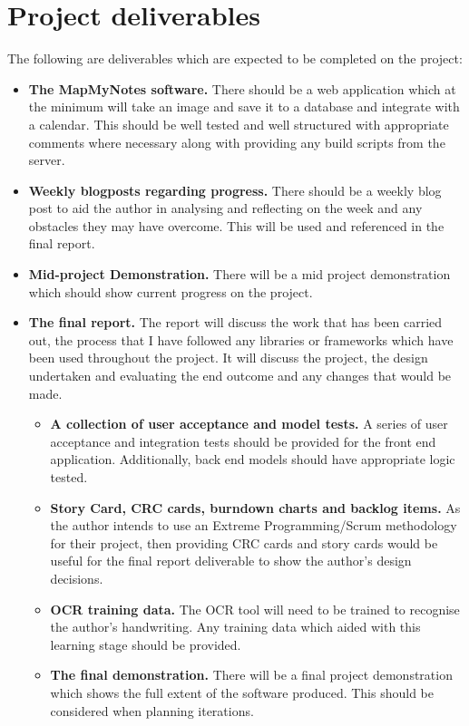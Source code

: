 \documentclass[11pt,fleqn,twoside]{article}
\begin{document}
\section{Project deliverables}
The following are deliverables which are expected to be completed on the project:
\begin{itemize}

  \item \textbf{The MapMyNotes software.} There should be a web application which at the minimum will take an image and save it to a database and integrate with a calendar. This should be well tested and well structured with appropriate comments where necessary along with providing any build scripts from the server.

  \item \textbf{Weekly blogposts regarding progress.} There should be a weekly blog post to aid the author in analysing and reflecting on the week and any obstacles they may have overcome. This will be used and referenced in the final report.

  \item \textbf{Mid-project Demonstration.} There will be a mid project demonstration which should show current progress on the project.

  \item \textbf{The final report.} The report will discuss the work that has been carried out, the process that I have followed any libraries or frameworks which have been used throughout the project. It will discuss the project, the design undertaken and evaluating the end outcome and any changes that would be made.

    \begin{itemize}

      \item \textbf{A collection of user acceptance and model tests.} A series of user acceptance and integration tests should be provided for the front end application. Additionally, back end models should have appropriate logic tested.

      \item \textbf{Story Card, CRC cards, burndown charts and backlog items.} As the author intends to use an Extreme Programming/Scrum methodology for their project, then providing CRC cards and story cards would be useful for the final report deliverable to show the author's design decisions.

      \item \textbf{OCR training data.} The OCR tool will need to be trained to recognise the author's handwriting. Any training data which aided with this learning stage should be provided.

      \item \textbf{The final demonstration.} There will be a final project demonstration which shows the full extent of the software produced. This should be considered when planning iterations.
    \end{itemize}

\end{itemize}
\end{document}
